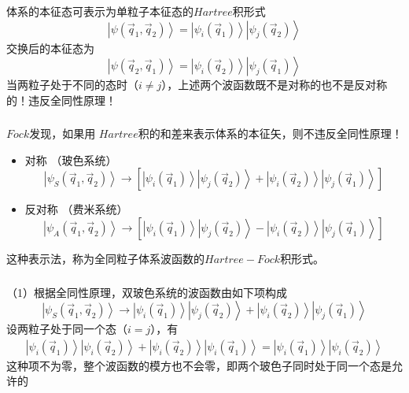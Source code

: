 \begin{frame}[label=current]
  \frametitle{}
体系的本征态可表示为单粒子本征态的$Hartree$积形式
\[\left\vert \psi(\vec{q}_1,\vec{q}_2) \right\rangle  = \left\vert \psi _i(\vec{q}_1)\right\rangle \left\vert \psi _j(\vec{q}_2)\right\rangle \]
交换后的本征态为 
  \[\left\vert \psi(\vec{q}_2,\vec{q}_1) \right\rangle  = \left\vert \psi _i(\vec{q}_2)\right\rangle \left\vert \psi _j(\vec{q}_1)\right\rangle \]
当两粒子处于不同的态时（$i \ne j$），上述两个波函数既不是对称的也不是反对称的！违反全同性原理！
\end{frame} 

\begin{frame}[label=current]
  \frametitle{}
$Fock$发现，如果用 $Hartree$积的和差来表示体系的本征矢，则不违反全同性原理！
\begin{itemize}
  \item 对称 （玻色系统）\[\left\vert \psi _S(\vec{q}_1,\vec{q}_2) \right\rangle  \to \left[\left\vert \psi _i(\vec{q}_1)\right\rangle \left\vert \psi _j(\vec{q}_2) \right\rangle  + \left\vert \psi _i(\vec{q}_2)\right\rangle \left\vert \psi _j(\vec{q}_1) \right\rangle\right] \]
  \item 反对称 （费米系统）\[\left\vert \psi _A (\vec{q}_1,\vec{q}_2) \right\rangle  \to \left[\left\vert \psi _i(\vec{q}_1)\right\rangle \left\vert \psi _j(\vec{q}_2) \right\rangle  - \left\vert \psi _i(\vec{q}_2)\right\rangle \left\vert \psi _j(\vec{q}_1) \right\rangle\right] \]
\end{itemize}
这种表示法，称为全同粒子体系波函数的$Hartree-Fock$积形式。
\end{frame}  

\begin{frame}[label=current]
  \frametitle{}
\证 （1）根据全同性原理，双玻色系统的波函数由如下项构成 
\[\left\vert \psi _S(\vec{q}_1,\vec{q}_2) \right\rangle  \to \left\vert \psi _i(\vec{q}_1)\right\rangle \left\vert \psi _j(\vec{q}_2) \right\rangle  + \left\vert \psi _i(\vec{q}_2)\right\rangle \left\vert \psi _j(\vec{q}_1) \right\rangle \]
设两粒子处于同一个态（$i = j$），有
\[
  \begin{aligned}
\left\vert \psi _i(\vec{q}_1)\right\rangle \left\vert \psi _i(\vec{q}_2) \right\rangle  + \left\vert \psi _i(\vec{q}_2)\right\rangle \left\vert \psi _i(\vec{q}_1) \right\rangle= \left\vert \psi _i(\vec{q}_1)\right\rangle \left\vert \psi _i(\vec{q}_2) \right\rangle 
  \end{aligned} \]
  这种项不为零，整个波函数的模方也不会零，即两个玻色子同时处于同一个态是允许的
\end{frame} 

